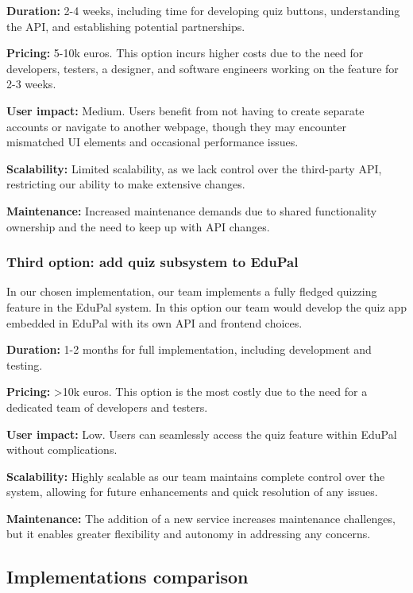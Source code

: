 \documentclass[
    english, %
]{VUMIFPSkursinis}
\begin{document}
\textbf{Duration:} 2-4 weeks, including time for developing quiz buttons, understanding the API, and establishing potential partnerships.

\textbf{Pricing:} 5-10k euros. This option incurs higher costs due to the need for developers, testers, a designer, and software engineers working on the feature for 2-3 weeks.

\textbf{User impact:} Medium. Users benefit from not having to create separate accounts or navigate to another webpage, though they may encounter mismatched UI elements and occasional performance issues.

\textbf{Scalability:} Limited scalability, as we lack control over the third-party API, restricting our ability to make extensive changes.

\textbf{Maintenance:} Increased maintenance demands due to shared functionality ownership and the need to keep up with API changes.

\subsubsection{Third option: add quiz subsystem to EduPal}

In our chosen implementation, our team implements a fully fledged quizzing feature in the EduPal system. In this option our team would develop the quiz app embedded in EduPal with its own API and frontend choices.

\textbf{Duration:} 1-2 months for full implementation, including development and testing.

\textbf{Pricing:} >10k euros. This option is the most costly due to the need for a dedicated team of developers and testers.

\textbf{User impact:} Low. Users can seamlessly access the quiz feature within EduPal without complications.

\textbf{Scalability:} Highly scalable as our team maintains complete control over the system, allowing for future enhancements and quick resolution of any issues.

\textbf{Maintenance:} The addition of a new service increases maintenance challenges, but it enables greater flexibility and autonomy in addressing any concerns.

\subsection{Implementations comparison}
\end{document}
